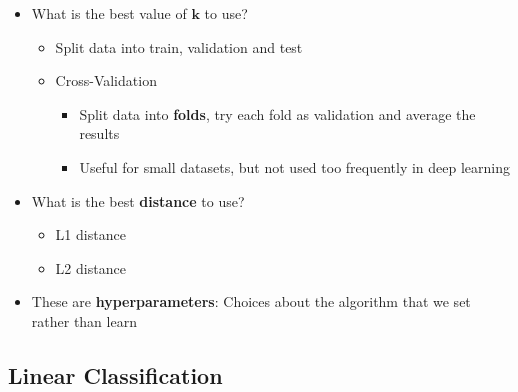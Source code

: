 \documentclass{scrartcl}
\begin{document}
\begin{itemize}
	\item What is the best value of $ \mathbf{k} $ to use?
	\begin{itemize}
		\item Split data into train, validation and test
		\item Cross-Validation
		\begin{itemize}
			\item Split data into \textbf{folds}, try each fold as validation and average the results
			\item Useful for small datasets, but not used too frequently in deep learning
		\end{itemize}
	\end{itemize}
	\item What is the best \textbf{distance} to use?
	\begin{itemize}
		\item L1 distance
		\item L2 distance
	\end{itemize}
	\item These are \textbf{hyperparameters}: Choices about the algorithm that we set rather than learn
\end{itemize}

\subsection{Linear Classification}
\end{document}
